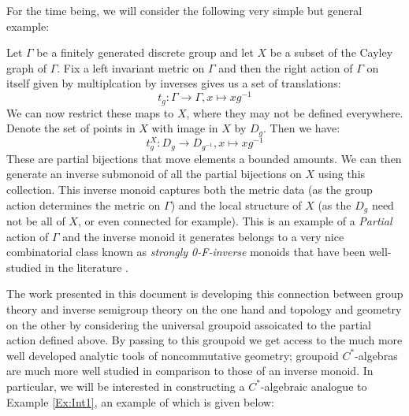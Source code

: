 For the time being, we will consider the following very simple but general example:
\begin{example}\label{Ex:Int1}
Let $\Gamma$ be a finitely generated discrete group and let $X$ be a subset of the Cayley graph of $\Gamma$. Fix a left invariant metric on $\Gamma$ and then the right action of $\Gamma$ on itself given by multiplcation by inverses gives us a set of translations:
\begin{equation*}
t_{g}: \Gamma \rightarrow \Gamma , x \mapsto xg^{-1}
\end{equation*}
We can now restrict these maps to $X$, where they may not be defined everywhere. Denote the set of points in $X$ with image in $X$ by $D_{g}$. Then we have:
\begin{equation*}
t_{g}^{X}: D_{g} \rightarrow D_{g^{-1}} , x \mapsto xg^{-1}
\end{equation*}
These are partial bijections that move elements a bounded amounts. We can then generate an inverse submonoid of all the partial bijections on $X$ using this collection. This inverse monoid captures both the metric data (as the group action determines the metric on $\Gamma$) and the local structure of $X$ (as the $D_{g}$ need not be all of $X$, or even connected for example). This is an example of a \textit{Partial} action of $\Gamma$ and the inverse monoid it generates belongs to a very nice combinatorial class known as \textit{strongly 0-F-inverse} monoids that have been well-studied in the literature \cite{}.
\end{example}

The work presented in this document is developing this connection between group theory and inverse semigroup theory on the one hand and topology and geometry on the other by considering the universal groupoid assoicated to the partial action defined above. By passing to this groupoid we get access to the much more well developed analytic tools of noncommutative geometry; groupoid $C^{*}$-algebras are much more well studied in comparison to those of an inverse monoid. In particular, we will be interested in constructing a $C^{*}$-algebraic analogue to Example \ref{Ex:Int1}, an example of which is given below:

